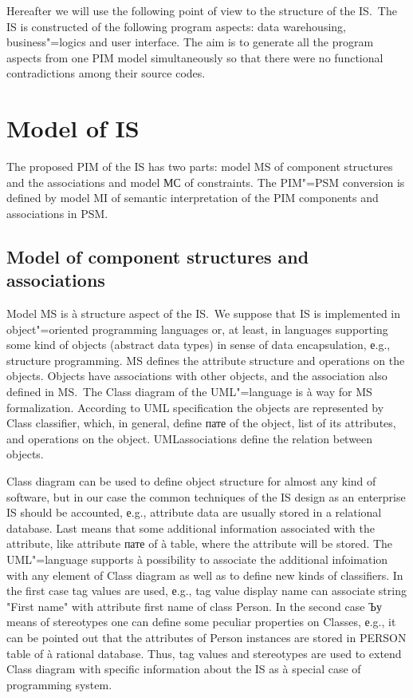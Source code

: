 \documentclass{intech}
\begin{document}
Hereafter we will use the following point of view to the structure of the IS.~The IS is constructed of the following program aspects: data warehousing, business"=logics and user interface. The aim is to generate all the program aspects from one PIM model simultaneously so that there were no functional contradictions among their source codes.

\section{Model of IS}
\label{sec:model-is}

The proposed PIM of the IS has two parts: model MS of component structures and the associations and model МС of constraints. The PIM"=PSM conversion is defined by model MI of semantic interpretation of the PIM components and associations in PSM.

\subsection{Model of component structures and associations}
\label{sec:mod-com-sec-assoc}

Model MS is à structure aspect of the IS.~We suppose that IS is implemented in object"=oriented programming languages or, at least, in languages supporting some kind of objects (abstract data types) in sense of data encapsulation, е.g., structure programming. MS defines the attribute structure and operations on the objects. Objects have associations with other objects, and the association also defined in MS.~The Class diagram of the UML"=language is à way for MS formalization. According to UML specification the objects are represented by Class classifier, which, in general, define пате of the object, list of its attributes, and operations on the object. UMLassociations define the relation between objects.

Class diagram can be used to define object structure for almost any kind of software, but in our case the common techniques of the IS design as an enterprise IS should be accounted, е.g., attribute data are usually stored in a relational database. Last means that some additional information associated with the attribute, like attribute пате of à table, where the attribute will be stored. The UML"=language supports à possibility to associate the additional infoimation with any element of Class diagram as well as to define new kinds of classifiers. In the first case tag values are used, е.g., tag value display name can associate string "First name" with attribute first name of class Person. In the second case Ъу means of stereotypes one can define some peculiar properties on Classes, е.g., it can be pointed out that the attributes of Person instances are stored in PERSON table of à rational database. Thus, tag values and stereotypes are used to extend Class diagram with specific information about the IS as à special case of programming system.
\end{document}

